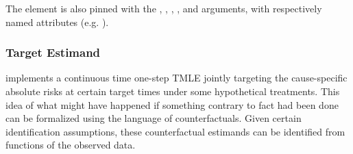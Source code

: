 \documentclass{report}
\newcommand{\1}{\ensuremath{\mathbf{1}}}
\begin{document}
The  element is also pinned with the , , , , and  arguments, with respectively named attributes (e.g. ).

\subsubsection{Target Estimand}
\label{Estimand}
 implements a continuous time one-step TMLE jointly targeting the cause-specific absolute risks at certain target times under some hypothetical treatments. This idea of what might have happened if something contrary to fact had been done can be formalized using the language of counterfactuals. Given certain identification assumptions, these counterfactual estimands can be identified from functions of the observed data.
\end{document}
